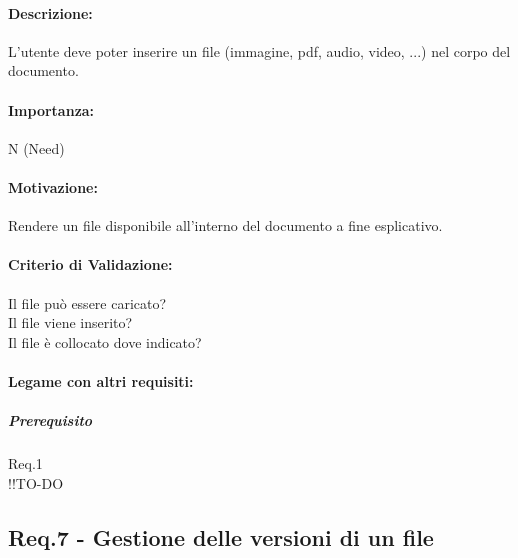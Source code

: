 \paragraph{Descrizione:}
	L'utente deve poter inserire un file (immagine, pdf, audio, video, ...) nel corpo del documento.
\paragraph{Importanza:}
	N (Need)
\paragraph{Motivazione:}
	Rendere un file disponibile all'interno del documento a fine esplicativo.
\paragraph{Criterio di Validazione:}
	Il file può essere caricato?\\
	Il file viene inserito?\\
	Il file è collocato dove indicato?
\paragraph{Legame con altri requisiti:}
	\subparagraph{Prerequisito} Req.1 \\!!TO-DO

\subsection{Req.7 - Gestione delle versioni di un file}



